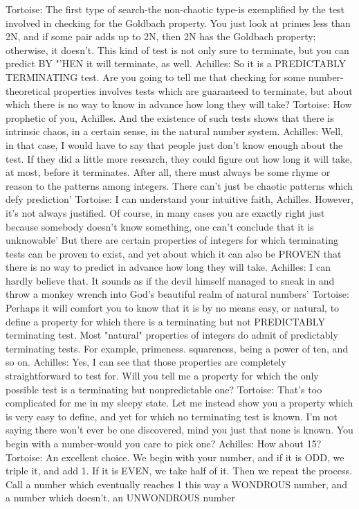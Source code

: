 Tortoise: The first type of search-the non-chaotic type-is exemplified by the test involved
    in checking for the Goldbach property. You just look at primes less than 2N, and if
    some pair adds up to 2N, then 2N has the Goldbach property; otherwise, it doesn't.
    This kind of test is not only sure to terminate, but you can predict BY "'HEN it will
    terminate, as well.
Achilles: So it is a PREDICTABLY TERMINATING test. Are you going to tell me that
    checking for some number-theoretical properties involves tests which are guaranteed
    to terminate, but about which there is no way to know in advance how long they will
    take?
Tortoise: How prophetic of you, Achilles. And the existence of such tests shows that
    there is intrinsic chaos, in a certain sense, in the natural number system.
Achilles: Well, in that case, I would have to say that people just don't know enough about
    the test. If they did a little more research, they could figure out how long it will take,
    at most, before it terminates. After all, there must always be some rhyme or reason to
    the patterns among integers. There can't just be chaotic patterns which defy
    prediction'
Tortoise: I can understand your intuitive faith, Achilles. However, it's not always
    justified. Of course, in many cases you are exactly right just because somebody
    doesn't know something, one can't conclude that it is unknowable' But there are
    certain properties of integers for which terminating tests can be proven to exist, and
    yet about which it can also be PROVEN that there is no way to predict in advance
    how long they will take.
Achilles: I can hardly believe that. It sounds as if the devil himself managed to sneak in
    and throw a monkey wrench into God's beautiful realm of natural numbers'
Tortoise: Perhaps it will comfort you to know that it is by no means easy, or natural, to
    define a property for which there is a terminating but not PREDICTABLY
    terminating test. Most "natural" properties of integers do admit of predictably
    terminating tests. For example, primeness. squareness, being a power of ten, and so
    on.
Achilles: Yes, I can see that those properties are completely straightforward to test for.
    Will you tell me a property for which the only possible test is a terminating but
    nonpredictable one?
Tortoise: That's too complicated for me in my sleepy state. Let me instead show you a
    property which is very easy to define, and yet for which no terminating test is
    known. I'm not saying there won't ever be one discovered, mind you just that none is
    known. You begin with a number-would you care to pick one?
Achilles: How about 15?
Tortoise: An excellent choice. We begin with your number, and if it is ODD, we triple it,
    and add 1. If it is EVEN, we take half of it. Then we repeat the process. Call a
    number which eventually reaches 1 this way a WONDROUS number, and a number
    which doesn't, an UNWONDROUS number




